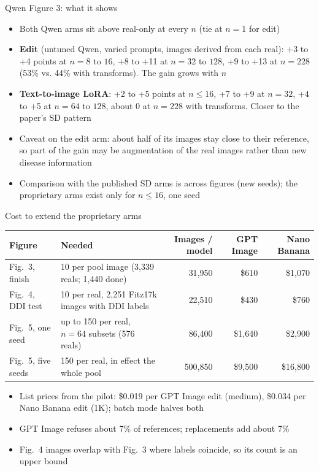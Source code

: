 \documentclass[aspectratio=169,11pt]{beamer}
\begin{document}
\begin{frame}{Qwen Figure 3: what it shows}
  \begin{itemize}
    \item Both Qwen arms sit above real-only at every $n$ (tie at $n = 1$ for edit)
    \item \textbf{Edit} (untuned Qwen, varied prompts, images derived from each real): +3 to +4 points at $n = 8$ to $16$, +8 to +11 at $n = 32$ to $128$, +9 to +13 at $n = 228$ (53\% vs. 44\% with transforms). The gain grows with $n$
    \item \textbf{Text-to-image LoRA}: +2 to +5 points at $n \le 16$, +7 to +9 at $n = 32$, +4 to +5 at $n = 64$ to $128$, about 0 at $n = 228$ with transforms. Closer to the paper's SD pattern
    \item Caveat on the edit arm: about half of its images stay close to their reference, so part of the gain may be augmentation of the real images rather than new disease information
    \item Comparison with the published SD arms is across figures (new seeds); the proprietary arms exist only for $n \le 16$, one seed
  \end{itemize}
\end{frame}

\begin{frame}{Cost to extend the proprietary arms}
  \begin{center}
  \scriptsize
  \begin{tabular}{lp{5cm}rrr}
    \toprule
    Figure & Needed & Images / model & GPT Image & Nano Banana \\
    \midrule
    Fig.\ 3, finish & 10 per pool image (3{,}339 reals; 1{,}440 done) & 31{,}950 & \$610 & \$1{,}070 \\
    Fig.\ 4, DDI test & 10 per real, 2{,}251 Fitz17k images with DDI labels & 22{,}510 & \$430 & \$760 \\
    Fig.\ 5, one seed & up to 150 per real, $n=64$ subsets (576 reals) & 86{,}400 & \$1{,}640 & \$2{,}900 \\
    Fig.\ 5, five seeds & 150 per real, in effect the whole pool & 500{,}850 & \$9{,}500 & \$16{,}800 \\
    \bottomrule
  \end{tabular}
  \end{center}
  \vspace{0.6em}
  \small
  \begin{itemize}
    \item List prices from the pilot: \$0.019 per GPT Image edit (medium), \$0.034 per Nano Banana edit (1K); batch mode halves both
    \item GPT Image refuses about 7\% of references; replacements add about 7\%
    \item Fig.\ 4 images overlap with Fig.\ 3 where labels coincide, so its count is an upper bound
  \end{itemize}
\end{frame}
\end{document}
